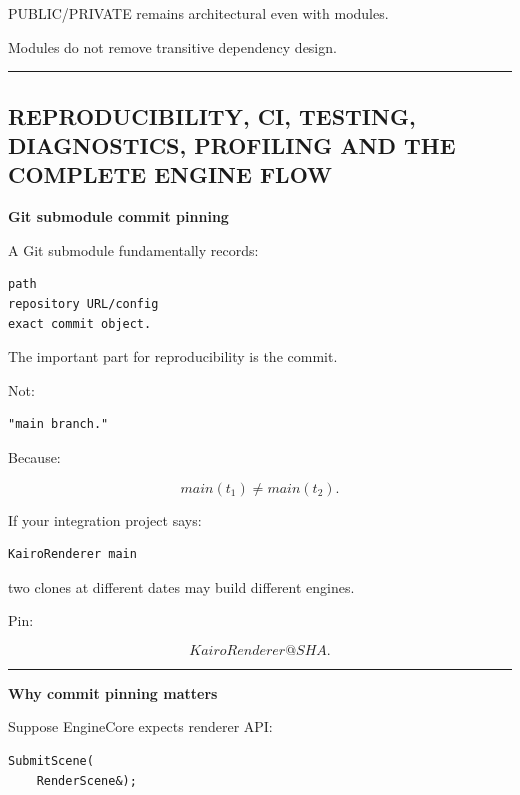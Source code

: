 PUBLIC/PRIVATE remains architectural even with modules.

Modules do not remove transitive dependency design.

\begin{center}\rule{0.5\linewidth}{0.5pt}\end{center}

\subsection{REPRODUCIBILITY, CI, TESTING, DIAGNOSTICS, PROFILING AND THE COMPLETE ENGINE FLOW}\label{01-foundations-i-ch010-reproducibility-ci-testing-diagnostics-profiling-and-the-complete-engine-flow}

\hypertarget{01-foundations-i-ch010-reproducibility-ci-testing-diagnostics-profiling-and-the-complete-engine-flow}{}

\textbf{Git submodule commit pinning}

A Git submodule fundamentally records:

\begin{verbatim}
path
repository URL/config
exact commit object.
\end{verbatim}

The important part for reproducibility is the commit.

Not:

\begin{verbatim}
"main branch."
\end{verbatim}

Because:

\[
main(t_1)
\neq
main(t_2).
\]

If your integration project says:

\begin{verbatim}
KairoRenderer main
\end{verbatim}

two clones at different dates may build different engines.

Pin:

\[
KairoRenderer@SHA.
\]

\begin{center}\rule{0.5\linewidth}{0.5pt}\end{center}

\textbf{Why commit pinning matters}

Suppose EngineCore expects renderer API:

\begin{verbatim}
SubmitScene(
    RenderScene&);
\end{verbatim}

